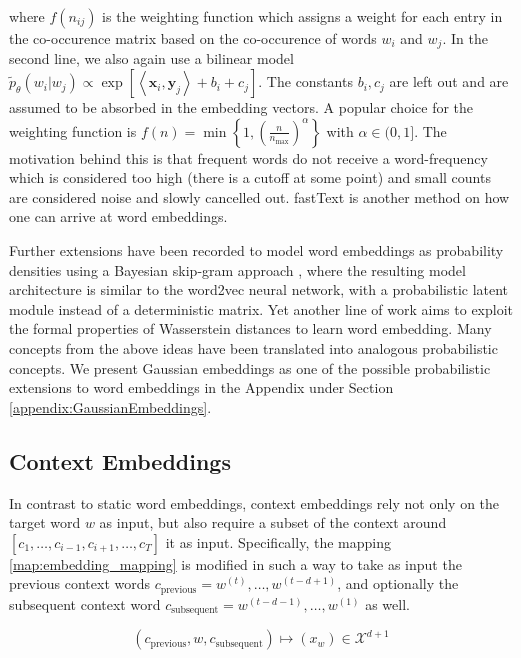 \documentclass[a4paper,12pt,twoside,openright]{report}
\begin{document}
where $f(n_{ij})$ is the weighting function which assigns a weight for each entry in the co-occurence matrix based on the co-occurence of words $w_i$ and $w_j$. 
In the second line, we also again use a bilinear model $\tilde{p}_{\theta}\left(w_{i} | w_{j}\right) \propto \exp \left[\left\langle\mathbf{x}_{i}, \mathbf{y}_{j}\right\rangle+b_{i}+c_{j}\right]$.
The constants $b_i, c_j$ are left out and are assumed to be absorbed in the embedding vectors.
A popular choice for the weighting function is 
$
f(n) = \min \left\lbrace 1, \left(\frac{n}{n_{\max}}\right)^{\alpha} \right\rbrace
$
with $\alpha \in (0, 1]$.
The motivation behind this is that frequent words do not receive a word-frequency which is considered too high (there is a cutoff at some point) and small counts are considered noise and slowly cancelled out.
fastText \cite{bojanowski17} is another method on how one can arrive at word embeddings.

Further extensions have been recorded to model word embeddings as probability densities using a Bayesian skip-gram approach \cite{brazinskas19}, where the resulting model architecture is similar to the word2vec neural network, with a probabilistic latent module instead of a deterministic matrix.
Yet another line of work \cite{yan19} aims to exploit the formal properties of Wasserstein distances to learn word embedding.
Many concepts from the above ideas have been translated into analogous probabilistic concepts.
We present Gaussian embeddings as one of the possible probabilistic  extensions to word embeddings in the Appendix under Section \ref{appendix:GaussianEmbeddings}.

\subsection{Context Embeddings}

In contrast to static word embeddings, context embeddings rely not only on the target word $w$ as input, but also require a subset of the context around $[c_1, \ldots, c_{i-1}, c_{i+1}, \ldots, c_T]$ it as input.
Specifically, the mapping \eqref{map:embedding_mapping} is modified in such a way to take as input the previous context words $c_\text{previous} = w^{(t)}, \ldots, w^{(t-d + 1)}$, and optionally the subsequent context word $c_\text{subsequent} = w^{(t-d - 1)}, \ldots, w^{(1)}$ as well.

\begin{equation}
(c_\text{previous}, w, c_\text{subsequent}) \mapsto (x_w) \in \mathcal{X}^{d + 1}
\end{equation}{\label{map:context_embedding_mapping}}
\end{document}
